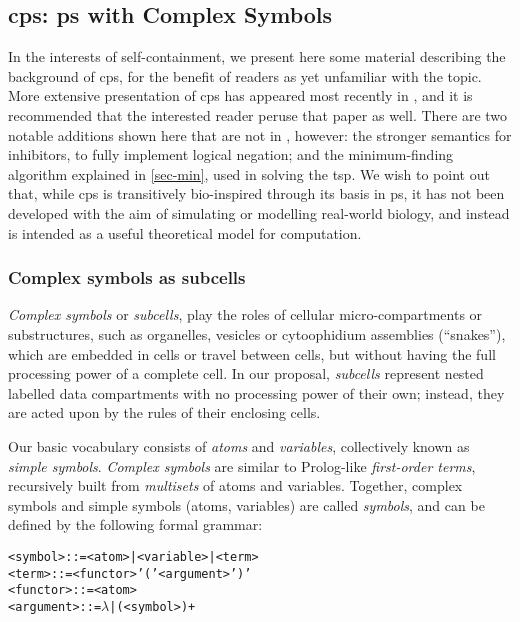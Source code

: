 \subsection{\label{sec:tsp:cpsystems}\texorpdfstring{\gls{cps}}{cP systems}: \texorpdfstring{\gls{ps}}{P systems} with Complex Symbols}

In the interests of self-containment, we present here some material describing the background of \gls{cps}, for the benefit of readers as yet unfamiliar with the topic.  More extensive presentation of \gls{cps} has appeared most recently in \cite{Nicolescu2018}, and it is recommended that the interested reader peruse that paper as well.  There are two notable additions shown here that are not in \cite{Nicolescu2018}, however: the stronger semantics for inhibitors, to fully implement logical negation; and the minimum-finding algorithm explained in \cref{sec-min}, used in solving the \gls{tsp}.  We wish to point out that, while \gls{cps} is transitively bio-inspired through its basis in \gls{ps}, it has not been developed with the aim of simulating or modelling real-world biology, and instead is intended as a useful theoretical model for computation.

\subsubsection{Complex symbols as subcells}

\emph{Complex symbols} or \emph{subcells}, 
play the roles of cellular micro-compartments or substructures,
such as organelles, vesicles or cytoophidium assemblies (``snakes''),
which are embedded in cells or travel between cells, 
but without having the full processing power of a complete cell.
In our proposal, \emph{subcells} represent nested labelled data compartments
with no processing power of their own;
instead, they are acted upon by the rules of their enclosing cells.

Our basic vocabulary consists of \emph{atoms} and \emph{variables}, 
collectively known as \emph{simple symbols}.
\emph{Complex symbols} are similar to Prolog-like \emph{first-order terms}, 
recursively built from \emph{multisets} of atoms and variables.
Together, complex symbols and simple symbols (atoms, variables) are called \emph{symbols},
and can be defined by the following formal grammar:

\begin{framed}
\vspace{-0.5cm}
\begin{small}
\begin{alltt}
    <symbol> ::= <atom> | <variable> | <term> 
    <term> ::= <functor> '(' <argument> ')'
    <functor> ::= <atom>
    <argument> ::= \(\lambda\) | ( <symbol> )+
\end{alltt}
\end{small}
\vspace{-0.5cm}
\end{framed}

